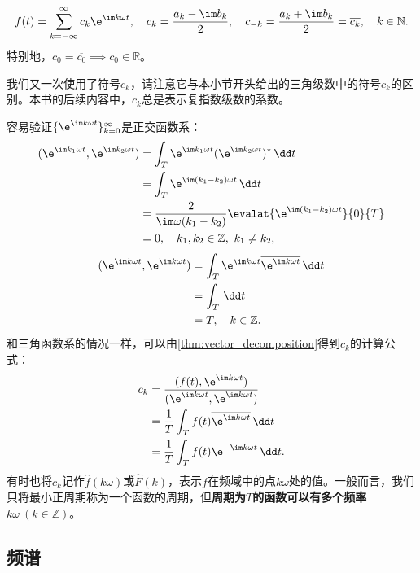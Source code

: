 \begin{definition}[复指数形式傅里叶展开]
    \begin{equation}
        f(t)=\sum_{k = -\infty}^{\infty} c_k \e^{\im k\omega t},\quad c_k=\frac{a_k-\im b_k}{2},\quad c_{-k}=\frac{a_k+\im b_k}{2}=\overline{c_k},\quad k\in \mathbb{N}.
    \end{equation}
    特别地，$c_0=\overline{c_0}\implies c_0\in\mathbb{R}$。
\end{definition}
我们又一次使用了符号$c_k$，请注意它与本小节开头给出的三角级数中的符号$c_k$的区别。本书的后续内容中，$c_k$总是表示复指数级数的系数。

容易验证$\{\e^{\im k\omega t}\}_{k=0}^{\infty}$是正交函数系：
\begin{align}
    (\e^{\im k_1\omega t},\e^{\im k_2\omega t})&=\int_{T}\e^{\im k_1\omega t}(\e^{\im k_2\omega t})^*\,\dd t\nonumber\\
    &=\int_{T}\e^{\im(k_1-k_2)\omega t}\,\dd t\nonumber\\
    &=\frac{2}{\im\omega (k_1-k_2)}\evalat{\e^{\im(k_1-k_2)\omega t}}{0}{T}\nonumber\\
    &=0,\quad k_1,k_2\in \mathbb{Z},\ k_1\neq k_2,
\end{align}
\begin{align}
    (\e^{\im k\omega t},\e^{\im k\omega t})&=\int_{T}\e^{\im k\omega t}\overline{\e^{\im k\omega t}}\,\dd t\nonumber\\
    &=\int_{T}\,\dd t\nonumber\\
    &=T,\quad k\in \mathbb{Z}.
\end{align}
和三角函数系的情况一样，可以由\cref{thm:vector_decomposition}得到$c_k$的计算公式：
\begin{align}
    c_k & =\frac{(f(t),\e^{\im k\omega t})}{(\e^{\im k\omega t},\e^{\im k\omega t})}\nonumber \\
        & =\frac{1}{T}\int_{T}f(t)\overline{\e^{\im k\omega t}}\,\dd t\nonumber                 \\
        & =\frac{1}{T}\int_{T}f(t)\e^{-\im k\omega t}\,\dd t.
\end{align}
有时也将$c_k$记作$\hat{f}(k\omega)$或$\hat{F}(k)$，表示$f$在频域中的点$k\omega$处的值。一般而言，我们只将最小正周期称为一个函数的周期，但\textbf{周期为$T$的函数可以有多个频率$k\omega\ (k \in \mathbb{Z})$}。

\subsection{频谱}\label{sub:spectrum}


